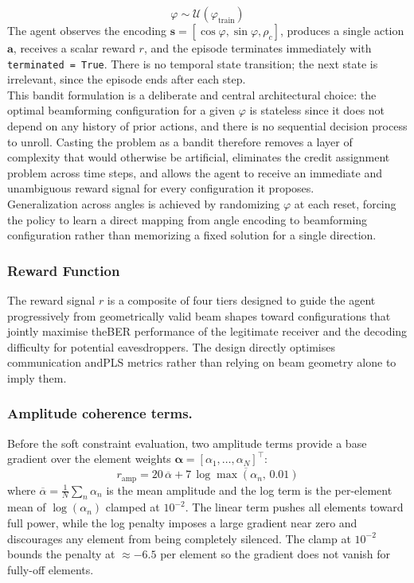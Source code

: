 \begin{equation}
    \varphi \sim \mathcal{U}(\varphi_{\text{train}})
\end{equation}
The agent observes the encoding $\mathbf{s} = [\cos\varphi, \sin\varphi, \rho_c]$, produces a single action $\mathbf{a}$, receives a scalar reward $r$, and the episode terminates immediately with \texttt{terminated = True}. There is no temporal state transition; the next state is irrelevant, since the episode ends after each step.\\
This bandit formulation is a deliberate and central architectural choice: the optimal beamforming configuration for a given $\varphi$ is stateless since it does not depend on any history of prior actions, and there is no sequential decision process to unroll. Casting the problem as a bandit therefore removes a layer of complexity that would otherwise be artificial, eliminates the credit assignment problem across time steps, and allows the agent to receive an immediate and unambiguous reward signal for every configuration it proposes. \\
Generalization across angles is achieved by randomizing $\varphi$ at each reset, forcing the policy to learn a direct mapping from angle encoding to beamforming configuration rather than memorizing a fixed solution for a single direction.
\subsubsection{Reward Function}
The reward signal $r$ is a composite of four tiers designed to guide the agent progressively from geometrically valid beam shapes toward configurations that jointly maximise the\gls{BER} performance of the legitimate receiver and the decoding difficulty for potential eavesdroppers. The design directly optimises communication and\gls{PLS} metrics rather than relying on beam geometry alone to imply them.

\subsubsection{Amplitude coherence terms.}
Before the soft constraint evaluation, two amplitude terms provide a base gradient over the element weights $\boldsymbol{\alpha} = [\alpha_1, \ldots, \alpha_N]^\top$:
\begin{equation}
    r_{\text{amp}} = 20\,\overline{\alpha} + 7\,\overline{\log\max(\alpha_n,\,0.01)}
\end{equation}
where $\overline{\alpha} = \frac{1}{N}\sum_n \alpha_n$ is the mean amplitude and the log term is the per-element mean of $\log(\alpha_n)$ clamped at $10^{-2}$. The linear term pushes all elements toward full power, while the log penalty imposes a large gradient near zero and discourages any element from being completely silenced. The clamp at $10^{-2}$ bounds the penalty at $\approx -6.5$ per element so the gradient does not vanish for fully-off elements.


